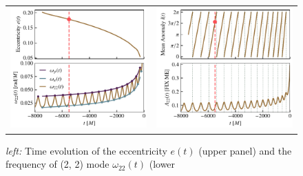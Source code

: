 \documentclass[aps,prd,amsmath,floats,floatfix, twocolumn,
superscriptaddress,nofootinbib,showpacs]{revtex4-1}
\begin{document}
\begin{figure} \centering
  \begin{tabular}{cc}
\includegraphics[width=\columnwidth]{ecc_definition} &
\includegraphics[width=\columnwidth]{mean_ano_definition}
  \end{tabular}
  \caption{{\itshape left:} Time evolution of the eccentricity $e(t)$
(upper panel) and the frequency of (2, 2) mode $\omega_{22}(t)$ (lower
}
\end{figure}
\end{document}

